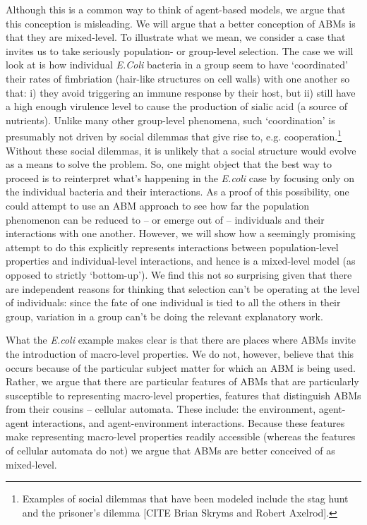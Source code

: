 \documentclass[11pt]{article}
\begin{document}
Although this is a common way to think of agent-based models, we argue that this conception is misleading. We will argue that a better conception of ABMs is that they are mixed-level.  To illustrate what we mean, we consider a case that invites us to take seriously population- or group-level selection.  The case we will look at is how individual \emph{E.Coli} bacteria in a group seem to have `coordinated'  their rates of fimbriation (hair-like structures on cell walls) with one another so that: i) they avoid triggering an immune response by their host, but ii) still have a high enough virulence level to cause the production of sialic acid (a source of nutrients).  Unlike many other group-level phenomena, such `coordination' is presumably not driven by social dilemmas that give rise to, e.g. cooperation.\footnote{Examples of social dilemmas that have been modeled include the stag hunt and the prisoner's dilemma [CITE Brian Skryms and Robert Axelrod].}  Without these social dilemmas, it is unlikely that a social structure would evolve as a means to solve the problem. So, one might object that the best way to proceed is to reinterpret what's happening in the \emph{E.coli} case by focusing only on the individual bacteria and their interactions. As a proof of this possibility, one could attempt to use an ABM approach to see how far the population phenomenon can be reduced to -- or emerge out of -- individuals and their interactions with one another. However, we will show how a seemingly promising attempt to do this explicitly represents interactions between population-level properties and individual-level interactions, and hence is a mixed-level model (as opposed to strictly `bottom-up'). We find this not so surprising given that there are independent reasons for thinking that selection can't be operating at the level of individuals: since the fate of one individual is tied to all the others in their group, variation in a group can't be doing the relevant explanatory work.

What the \emph{E.coli} example makes clear is that there are places where ABMs invite the introduction of macro-level properties.  We do not, however, believe that this occurs because of the particular subject matter for which an ABM is being used. Rather, we argue that there are particular features of ABMs that are particularly susceptible to representing macro-level properties, features that distinguish ABMs from their cousins -- cellular automata. These include: the environment, agent-agent interactions, and agent-environment interactions.  Because these features make representing macro-level properties readily accessible (whereas the features of cellular automata do not) we argue that ABMs are better conceived of as mixed-level.
\end{document}
